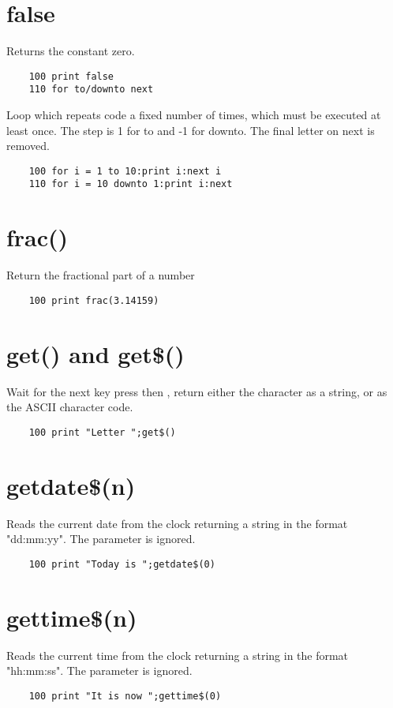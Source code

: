 \section*{false}
Returns the constant zero.
\example{}
\begin{verbatim}
	100 print false
	110 for to/downto next
\end{verbatim}
Loop which repeats code a fixed number of times, which must be executed at least once. The step is 1 for to and -1 for downto. The final letter on next is removed.
\example{}
\begin{verbatim}
	100 for i = 1 to 10:print i:next i
	110 for i = 10 downto 1:print i:next
\end{verbatim}

\section*{frac()}
Return the fractional part of a number
\example{}
\begin{verbatim}
	100 print frac(3.14159)
\end{verbatim}

\section*{get() and get\$()}
Wait for the next key press then , return either the character as a string, or as the ASCII character code. 
\example{}
\begin{verbatim}
	100 print "Letter ";get$()
\end{verbatim}

\section*{getdate\$(n)}
Reads the current date from the clock returning a string in the format "dd:mm:yy". The parameter is ignored.
\example{}
\begin{verbatim}
	100 print "Today is ";getdate$(0)
\end{verbatim}

\section*{gettime\$(n)}
Reads the current time from the clock returning a string in the format "hh:mm:ss". The parameter is ignored.
\example{}
\begin{verbatim}
	100 print "It is now ";gettime$(0)
\end{verbatim}

